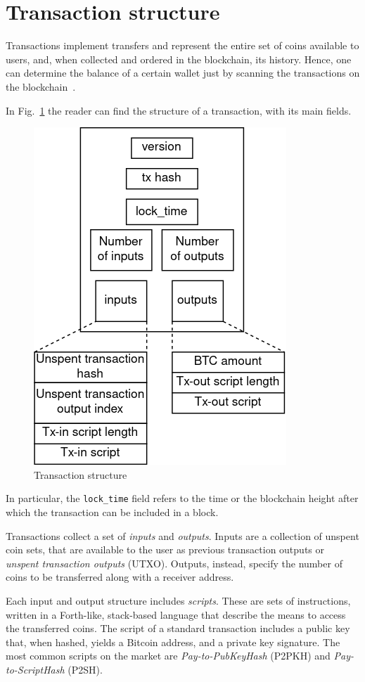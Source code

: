 \section{Transaction structure}\label{sec:tx}
Transactions implement transfers and represent the entire set of coins available to users, and, when collected and ordered in the blockchain, its history. Hence, one can determine the balance of a certain wallet just by scanning the transactions on the blockchain~\cite{tschorsch-intro-survey}.

In Fig.~\ref{fig:tx} the reader can find the structure of a transaction, with its main fields.

\begin{figure}[h]
	\includegraphics[width=.40\textwidth]{pict/txstruct.png}
	\centering
	\caption{Transaction structure}
	\label{fig:tx}
\end{figure}

In particular, the \texttt{lock\_time} field refers to the time or the blockchain height after which the transaction can be included in a block.

Transactions collect a set of \emph{inputs} and \emph{outputs}. Inputs are a collection of unspent coin sets, that are available to the user as previous transaction outputs or \textit{unspent transaction outputs} (UTXO). Outputs, instead, specify the number of coins to be transferred along with a receiver address.

Each input and output structure includes \emph{scripts}. These are sets of instructions, written in a Forth-like, stack-based language that describe the means to access the transferred coins. The script of a standard transaction includes a public key that, when hashed, yields a Bitcoin address, and a private key signature. The most common scripts on the market are \emph{Pay-to-PubKeyHash} (P2PKH) and \emph{Pay-to-ScriptHash} (P2SH).


